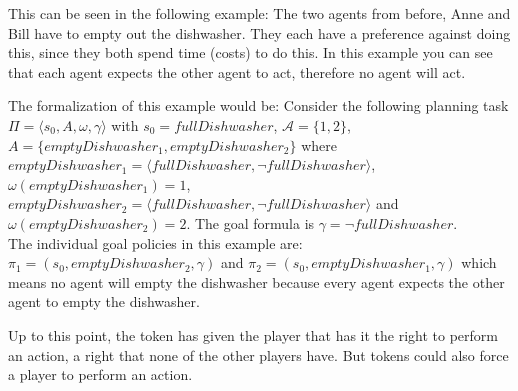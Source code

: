 
This can be seen in the following example: The two agents from before, Anne and Bill have to empty out the dishwasher. They each have a preference against doing this, since they both spend time (costs) to do this.
In this example you can see that each agent expects the other agent to act, therefore no agent will act.

The formalization of this example would be: Consider the following planning task $\Pi = \langle s_0, A, \omega, \gamma \rangle $ with $s_0= fullDishwasher$, $\mathcal{A} = \{1,2\}$,
\\$A=\{emptyDishwasher_1, emptyDishwasher_2\}$ where \\
  $emptyDishwasher_1=\langle fullDishwasher, \neg fullDishwasher \rangle$, \\
   $\omega(emptyDishwasher_1)=1$, \\
   $emptyDishwasher_2= \langle fullDishwasher, \neg fullDishwasher \rangle$ and \\
 $\omega(emptyDishwasher_2)=2$. The goal formula is $\gamma = \neg fullDishwasher$.\\
The individual goal policies in this example are: $\pi_1=(s_0,emptyDishwasher_2, \gamma)$ and $\pi_2=(s_0, emptyDishwasher_1, \gamma)$ which means no agent will empty the dishwasher because every agent expects the other agent to empty the dishwasher.


Up to this point, the token has given the player that has it the right to perform an action, a right that none of the other players have. But tokens could also force a player to perform an action.

